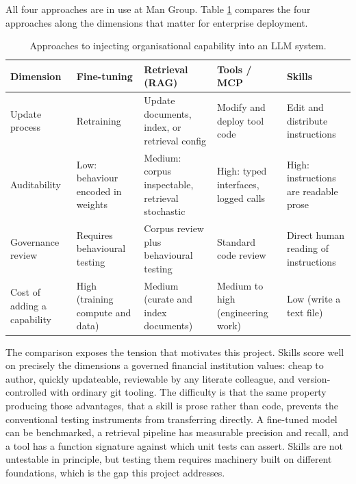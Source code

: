 All four approaches are in use at Man Group. Table \ref{tab:organisational-capability} compares the four approaches along the dimensions that matter for enterprise deployment.
\begin{table}[htbp]
    \centering
    \caption{Approaches to injecting organisational capability
    into an LLM system.}
    \label{tab:organisational-capability}

    \small
    \renewcommand{\arraystretch}{1.2}
    \setlength{\tabcolsep}{4pt}

    \begin{tabularx}{\linewidth}{
        *{5}{>{\raggedright\arraybackslash}X}
    }
        \toprule
        \textbf{Dimension}
        & \textbf{Fine-tuning}
        & \textbf{Retrieval (RAG)}
        & \textbf{Tools / MCP}
        & \textbf{Skills} \\
        \midrule

        Update process
        & Retraining
        & Update documents, index, or retrieval config
        & Modify and deploy tool code
        & Edit and distribute instructions \\

        Auditability
        & Low: behaviour encoded in weights
        & Medium: corpus inspectable, retrieval stochastic
        & High: typed interfaces, logged calls
        & High: instructions are readable prose \\
        \addlinespace

        Governance review
        & Requires behavioural testing
        & Corpus review plus behavioural testing
        & Standard code review
        & Direct human reading of instructions \\
        \addlinespace

        Cost of adding a capability
        & High (training compute and data)
        & Medium (curate and index documents)
        & Medium to high (engineering work)
        & Low (write a text file) \\

        \bottomrule
    \end{tabularx}
\end{table}

\noindent The comparison exposes the tension that motivates this project. Skills score well on precisely the dimensions a governed financial institution values: cheap to author, quickly updateable, reviewable by any literate colleague, and version-controlled with ordinary git tooling. The difficulty is that the same property producing those advantages, that a skill is prose rather than code, prevents the conventional testing instruments from transferring directly. A fine-tuned model can be benchmarked, a retrieval pipeline has measurable precision and recall, and a tool has a function signature against which unit tests can assert. Skills are not untestable in principle, but testing them requires machinery built on different foundations, which is the gap this project addresses. 


